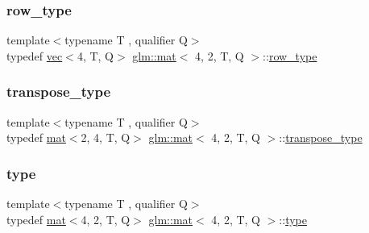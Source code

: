 \subsubsection{\texorpdfstring{row\+\_\+type}{row\_type}}
{\footnotesize\ttfamily template$<$typename T , qualifier Q$>$ \\
typedef \mbox{\hyperlink{structglm_1_1vec}{vec}}$<$4, T, Q$>$ \mbox{\hyperlink{structglm_1_1mat}{glm\+::mat}}$<$ 4, 2, T, Q $>$\+::\mbox{\hyperlink{structglm_1_1mat_3_014_00_012_00_01_t_00_01_q_01_4_a33d6c2074d5507b728a6e2e91a84f6a8}{row\+\_\+type}}}

\mbox{\label{structglm_1_1mat_3_014_00_012_00_01_t_00_01_q_01_4_ab74329af13d01d0d1bdac3ea3619fc68}} 
\subsubsection{\texorpdfstring{transpose\+\_\+type}{transpose\_type}}
{\footnotesize\ttfamily template$<$typename T , qualifier Q$>$ \\
typedef \mbox{\hyperlink{structglm_1_1mat}{mat}}$<$2, 4, T, Q$>$ \mbox{\hyperlink{structglm_1_1mat}{glm\+::mat}}$<$ 4, 2, T, Q $>$\+::\mbox{\hyperlink{structglm_1_1mat_3_014_00_012_00_01_t_00_01_q_01_4_ab74329af13d01d0d1bdac3ea3619fc68}{transpose\+\_\+type}}}

\mbox{\label{structglm_1_1mat_3_014_00_012_00_01_t_00_01_q_01_4_aecca78e9fbf467c7558b6018401c3f29}} 
\subsubsection{\texorpdfstring{type}{type}}
{\footnotesize\ttfamily template$<$typename T , qualifier Q$>$ \\
typedef \mbox{\hyperlink{structglm_1_1mat}{mat}}$<$4, 2, T, Q$>$ \mbox{\hyperlink{structglm_1_1mat}{glm\+::mat}}$<$ 4, 2, T, Q $>$\+::\mbox{\hyperlink{structglm_1_1mat_3_014_00_012_00_01_t_00_01_q_01_4_aecca78e9fbf467c7558b6018401c3f29}{type}}}

